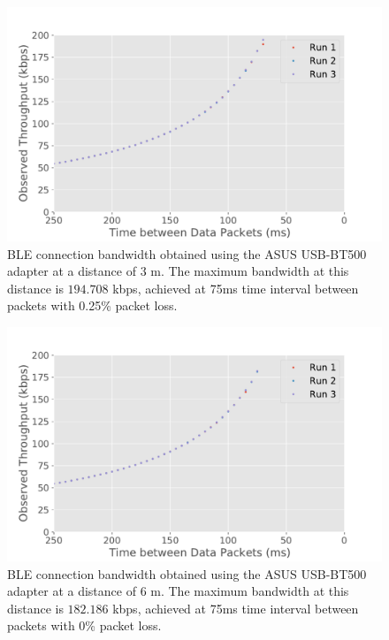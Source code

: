\begin{figure}[H]
    \centering
    \includegraphics[width=0.75\linewidth]{images/ble-bandwidth-hci0-300cm.pdf}
    \caption[\acs{BLE} connection bandwidth obtained using the ASUS USB-BT500 adapter at a distance of 3 m.]{\acs{BLE} connection bandwidth obtained using the ASUS USB-BT500 adapter at a distance of $3\text{ m}$. The maximum bandwidth at this distance is $194.708$ kbps, achieved at 75ms time interval between packets with 0.25\% packet loss.}
    \label{fig:ble-bandwidth-hci0-3m}
\end{figure}

\begin{figure}[H]
    \centering
    \includegraphics[width=0.75\linewidth]{images/ble-bandwidth-hci0-600cm.pdf}
    \caption[\acs{BLE} connection bandwidth obtained using the ASUS USB-BT500 adapter at a distance of 6 m.]{\acs{BLE} connection bandwidth obtained using the ASUS USB-BT500 adapter at a distance of $6\text{ m}$. The maximum bandwidth at this distance is $182.186$ kbps, achieved at 75ms time interval between packets with 0\% packet loss.}
    \label{fig:ble-bandwidth-hci0-6m}
\end{figure}

